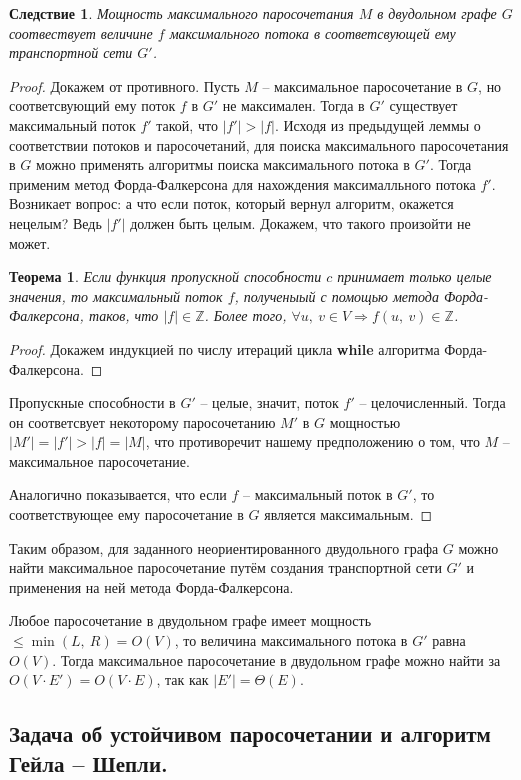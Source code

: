 \documentclass[a4paper,12pt]{article}
\newtheorem*{theorem}{Теорема}
\newtheorem*{consequence}{Следствие}
\newcommand{\Z}{\mathbb{Z}}
\begin{document}
\begin{consequence}
 Мощность максимального паросочетания $M$ в двудольном графе $G$ соотвествует величине $f$ максимального потока в соответсвующей ему транспортной сети $G'$.
\end{consequence}
\begin{proof}
Докажем от противного. Пусть $M$ -- максимальное паросочетание в $G$, но соответсвующий ему поток $f$ в $G'$ не максимален. Тогда в $G'$ существует максимальный поток $f'$ такой, что $|f'| > |f|$. Исходя из предыдущей леммы о соответствии потоков и паросочетаний, для поиска максимального паросочетания в $G$ можно применять алгоритмы поиска максимального потока в $G'$. Тогда применим метод Форда-Фалкерсона для нахождения максималльного потока $f'$. Возникает вопрос: а что если поток, который вернул алгоритм, окажется нецелым? Ведь $|f'|$ должен быть целым. Докажем, что такого произойти не может.
\begin{theorem}
 Если функция пропускной способности $c$ принимает только целые значения, то максимальный поток $f$, полученыый с помощью метода Форда-Фалкерсона, таков, что $|f| \in \Z$. Более того, $\forall u,\ v \in V \Rightarrow f(u,\ v) \in \Z$.
\end{theorem}
\begin{proof}
Докажем индукцией по числу итераций цикла \textbf{while} алгоритма Форда-Фалкерсона.
\end{proof}
Пропускные способности в $G'$ -- целые, значит, поток $f'$ -- целочисленный. Тогда он соответсвует некоторому паросочетанию $M'$ в $G$ мощностью $|M'| = |f'| > |f| = |M|$, что противоречит нашему предположению о том, что $M$ -- максимальное паросочетание.

Аналогично показывается, что если $f$ -- максимальный поток в $G'$, то соответствующее ему паросочетание в $G$ является максимальным.
\end{proof}

Таким образом, для заданного неориентированного двудольного графа $G$ можно найти максимальное паросочетание путём создания транспортной сети $G'$ и применения на ней метода Форда-Фалкерсона.

Любое паросочетание в двудольном графе имеет мощность $\leqslant \min(L,\ R) = O(V)$, то величина максимального потока в $G'$ равна $O(V)$. Тогда максимальное паросочетание в двудольном графе можно найти за $O(V\cdot E') = O(V \cdot E)$, так как $|E'| = \Theta(E)$.

\subsection{Задача об устойчивом паросочетании и алгоритм Гейла – Шепли.}
\end{document}
